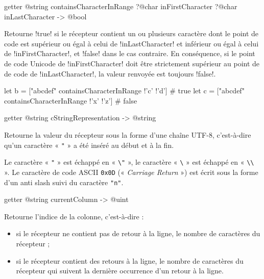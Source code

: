 \begin{galgasbox}
getter @string containsCharacterInRange
  ?@char inFirstCharacter
  ?@char inLastCharacter
  -> @bool
\end{galgasbox}

Retourne \ggs!true! si le récepteur contient un ou plusieurs caractère dont le point de code est supérieur ou égal à celui de \ggs!inLastCharacter! et inférieur ou égal à celui de \ggs!inFirstCharacter!, et \ggs!false! dans le cas contraire. En conséquence, si le point de code Unicode de \ggs!inFirstCharacter! doit être strictement supérieur au point de de code de \ggs!inLastCharacter!, la valeur renvoyée est toujours \ggs!false!.

\begin{galgas}
let b = ["abcdef" containsCharacterInRange !'c' !'d'] # true
let c = ["abcdef" containsCharacterInRange !'x' !'z'] # false
\end{galgas}









\begin{galgasbox}
getter @string cStringRepresentation -> @string
\end{galgasbox}

Retourne la valeur du récepteur sous la forme d'une chaîne UTF-8, c'est-à-dire qu'un caractère « \texttt{"} » a été inséré au début et à la fin.

Le caractère « \texttt{"} » est échappé en « \texttt{\textbackslash"} », le caractère « \texttt{\textbackslash} » est échappé en « \texttt{\textbackslash\textbackslash} ». Le caractère de code ASCII \texttt{0x0D} (« \emph{Carriage Return} ») est écrit sous la forme d'un anti slash suivi du caractère \texttt{"n"}. 








\begin{galgasbox}
getter @string currentColumn -> @uint
\end{galgasbox}

Retourne l'indice de la colonne, c'est-à-dire :
\begin{itemize}
\item si le récepteur ne contient pas de retour à la ligne, le nombre de caractères du récepteur ;
\item si le récepteur contient des retours à la ligne, le nombre de caractères du récepteur qui suivent la dernière occurrence d'un retour à la ligne.
\end{itemize}







